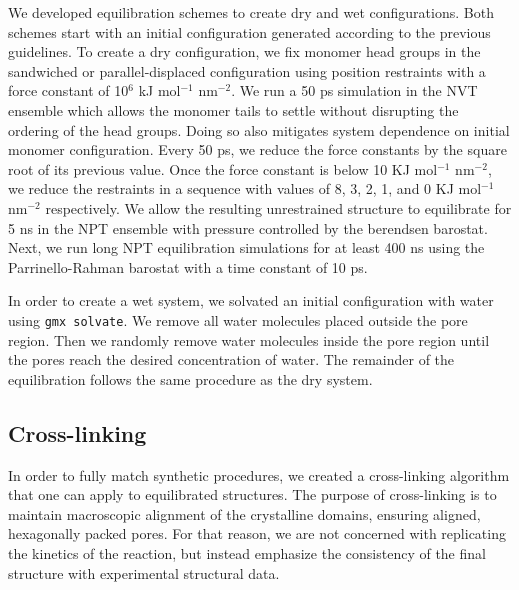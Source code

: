 \documentclass{article}
\begin{document}
  We developed equilibration schemes to create dry and wet configurations. Both
  schemes start with an initial configuration generated according to the previous
  guidelines. To create a dry configuration, we fix monomer head groups in the
  sandwiched or parallel-displaced configuration using position restraints with a
  force constant of 10$^6$ kJ mol$^{-1}$ nm$^{-2}$. We run a 50 ps simulation in
  the NVT ensemble which allows the monomer tails to settle without disrupting
  the ordering of the head groups. Doing so also mitigates system dependence on
  initial monomer configuration. Every 50 ps, we reduce the force constants by
  the square root of its previous value. Once the force constant is below 10 KJ
  mol$^{-1}$ nm$^{-2}$, we reduce the restraints in a sequence with values of
  8, 3, 2, 1, and 0 KJ mol$^{-1}$ nm$^{-2}$ respectively. We allow the resulting
  unrestrained structure to equilibrate for 5 ns in the NPT ensemble
  with pressure controlled by the berendsen barostat. Next, we run long NPT
  equilibration simulations for at least 400 ns using the Parrinello-Rahman
  barostat with a time constant of 10 ps.

  In order to create a wet system, we solvated an initial configuration with
  water using \texttt{gmx solvate}. We remove all water molecules placed outside
  the pore region. Then we randomly remove water molecules inside the pore region
  until the pores reach the desired concentration of water. The remainder of the
  equilibration follows the same procedure as the dry system. 

  \subsection{Cross-linking}
  
  In order to fully match synthetic procedures, we created a cross-linking
  algorithm that one can apply to equilibrated structures. The purpose of
  cross-linking is to maintain macroscopic alignment of the crystalline domains,
  ensuring aligned, hexagonally packed pores. For that reason, we are not
  concerned with replicating the kinetics of the reaction, but instead emphasize
  the consistency of the final structure with experimental structural data. 
\end{document}
